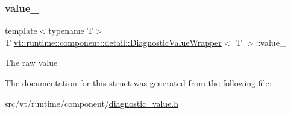 \subsubsection{\texorpdfstring{value\+\_\+}{value\_}}
{\footnotesize\ttfamily template$<$typename T$>$ \\
T \hyperlink{structvt_1_1runtime_1_1component_1_1detail_1_1_diagnostic_value_wrapper}{vt\+::runtime\+::component\+::detail\+::\+Diagnostic\+Value\+Wrapper}$<$ T $>$\+::value\+\_\+\hspace{0.3cm}{\ttfamily [private]}}

The raw value 

The documentation for this struct was generated from the following file\+:\begin{DoxyCompactItemize}
\item 
src/vt/runtime/component/\hyperlink{diagnostic__value_8h}{diagnostic\+\_\+value.\+h}\end{DoxyCompactItemize}
